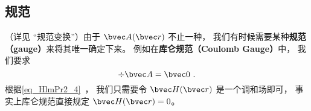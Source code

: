 \subsection{规范}
（详见 “规范变换”）由于 $\bvec A(\bvec r)$ 不止一种， 我们有时候需要某种\textbf{规范（gauge）}来将其唯一确定下来。 例如在\textbf{库仑规范（Coulomb Gauge）}中， 我们要求
\begin{equation}
\div \bvec A = \bvec 0~.
\end{equation}
根据\autoref{eq_HlmPr2_4}~， 我们只需要令 $\bvec H(\bvec r)$ 是一个调和场即可， 事实上库仑规范直接规定 $\bvec H(\bvec r) = 0$。
